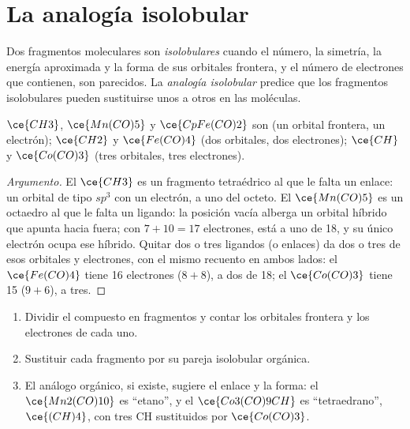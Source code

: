 \section{La analogía isolobular}

\begin{definition}\label{def:b3:organometallic-bonding:isolobal}
Dos fragmentos moleculares son \emph{isolobulares} cuando el
número, la simetría, la energía aproximada y la forma de sus orbitales frontera, y el
número de electrones que contienen, son parecidos. La \emph{analogía
isolobular} predice que los fragmentos isolobulares pueden sustituirse
unos a otros en las moléculas.
\end{definition}

\begin{proposition}\label{prop:b3:organometallic-bonding:isolobal}
$\ce{CH3}$, $\ce{Mn(CO)5}$ y $\ce{CpFe(CO)2}$ son  (un orbital frontera, un electrón);
$\ce{CH2}$ y $\ce{Fe(CO)4}$ (dos orbitales, dos electrones); $\ce{CH}$ y $\ce{Co(CO)3}$ (tres orbitales,
tres electrones).
\end{proposition}

\begin{proof}[Argumento]
El $\ce{CH3}$ es un fragmento tetraédrico al que le falta un enlace: un orbital de tipo $sp^3$ con un
electrón, a uno del octeto. El $\ce{Mn(CO)5}$ es un octaedro al que le falta un ligando: la
posición vacía alberga un orbital híbrido que apunta hacia fuera; con $7 + 10 = 17$ electrones, está a uno
de 18, y su único electrón ocupa ese híbrido. Quitar dos o tres
ligandos (o enlaces) da dos o tres de esos orbitales y electrones, con el
mismo recuento en ambos lados: el $\ce{Fe(CO)4}$ tiene 16 electrones ($8 + 8$), a dos de 18;
el $\ce{Co(CO)3}$ tiene 15 ($9 + 6$), a tres.
\end{proof}

\begin{method}\label{met:b3:organometallic-bonding:isolobal}
\begin{enumerate}
  \item Dividir el compuesto en fragmentos y contar los orbitales frontera
        y los electrones de cada uno.
  \item Sustituir cada fragmento por su pareja isolobular orgánica.
  \item El análogo orgánico, si existe, sugiere el enlace y la forma:
        el $\ce{Mn2(CO)10}$ es ``etano'', y el $\ce{Co3(CO)9CH}$ es ``tetraedrano'', $\ce{(CH)4}$, con tres CH
        sustituidos por $\ce{Co(CO)3}$.
\end{enumerate}
\end{method}

